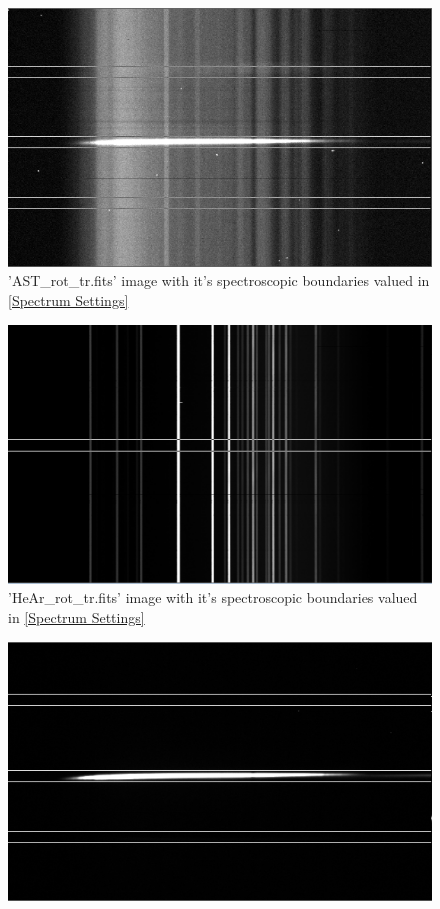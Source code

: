 \documentclass[12pt]{article}
\begin{document}
\newpage
\begin{multicols}{3}
\centering
\begin{figure} [H]
  \centering
  \ContinuedFloat*
  \includegraphics[scale=0.4]{Images/AsImages/S4/AST/AST_Spectrum.PNG}
  \caption{\label{AST Spectrum} 'AST\_rot\_tr.fits' image with it's spectroscopic boundaries valued in \cref{Spectrum Settings}}
\end{figure}
\begin{figure}[H]
  \centering
  \ContinuedFloat
  \includegraphics[scale=0.4]{Images/AsImages/S4/HeAr/HeAr_Spectrum.PNG}
  \caption{\label{HeAr Spectrum} 'HeAr\_rot\_tr.fits' image with it's spectroscopic boundaries valued in \cref{Spectrum Settings}}
\end{figure}
\begin{figure}[H]
  \centering
  \ContinuedFloat
  \includegraphics[scale=0.4]{Images/AsImages/S4/SA/SA_Spectrum.PNG}

\end{figure}
\end{multicols}
\end{document}
